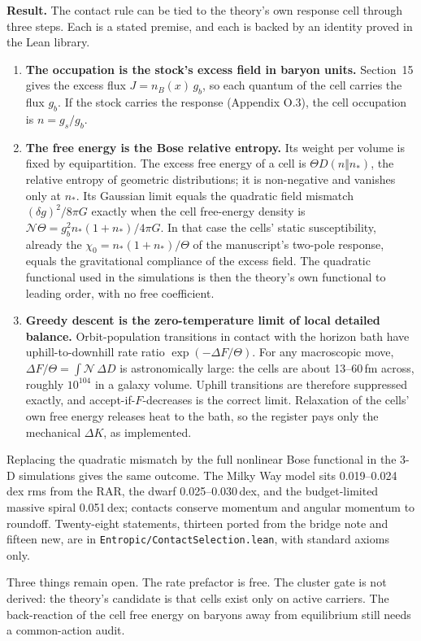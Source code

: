 \textbf{Result.} The contact rule can be tied to the theory's own response cell through three steps. Each is a stated premise, and each is backed by an identity proved in the Lean library.
\begin{enumerate}
\item \textbf{The occupation is the stock's excess field in baryon units.} Section~15 gives the excess flux $J=n_B(x)\,g_b$, so each quantum of the cell carries the flux $g_b$. If the stock carries the response (Appendix O.3), the cell occupation is $n=g_s/g_b$.
\item \textbf{The free energy is the Bose relative entropy.} Its weight per volume is fixed by equipartition. The excess free energy of a cell is $\Theta D(n\Vert n_*)$, the relative entropy of geometric distributions; it is non-negative and vanishes only at $n_*$. Its Gaussian limit equals the quadratic field mismatch $(\delta g)^2/8\pi G$ exactly when the cell free-energy density is $\mathcal N\Theta=g_b^2n_*(1+n_*)/4\pi G$. In that case the cells' static susceptibility, already the $\chi_0=n_*(1+n_*)/\Theta$ of the manuscript's two-pole response, equals the gravitational compliance of the excess field. The quadratic functional used in the simulations is then the theory's own functional to leading order, with no free coefficient.
\item \textbf{Greedy descent is the zero-temperature limit of local detailed balance.} Orbit-population transitions in contact with the horizon bath have uphill-to-downhill rate ratio $\exp(-\Delta F/\Theta)$. For any macroscopic move, $\Delta F/\Theta=\int\mathcal N\,\Delta D$ is astronomically large: the cells are about 13--60\,fm across, roughly $10^{104}$ in a galaxy volume. Uphill transitions are therefore suppressed exactly, and accept-if-$F$-decreases is the correct limit. Relaxation of the cells' own free energy releases heat to the bath, so the register pays only the mechanical $\Delta K$, as implemented.
\end{enumerate}
Replacing the quadratic mismatch by the full nonlinear Bose functional in the 3-D simulations gives the same outcome. The Milky Way model sits 0.019--0.024\,dex rms from the RAR, the dwarf 0.025--0.030\,dex, and the budget-limited massive spiral 0.051\,dex; contacts conserve momentum and angular momentum to roundoff. Twenty-eight statements, thirteen ported from the bridge note and fifteen new, are in \texttt{Entropic/ContactSelection.lean}, with standard axioms only.

Three things remain open. The rate prefactor is free. The cluster gate is not derived: the theory's candidate is that cells exist only on active carriers. The back-reaction of the cell free energy on baryons away from equilibrium still needs a common-action audit.

